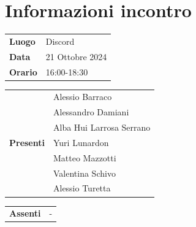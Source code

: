 \section{Informazioni incontro}
\vspace{0.25cm}
\begin{tabular}{p{1.75cm} | l}
    \textbf{Luogo} & Discord \\
    \textbf{Data} & 21 Ottobre 2024\\
    \textbf{Orario} & 16:00-18:30\\
\end{tabular}

\vspace{0.5cm}
\noindent
\begin{tabular}{p{1.75cm} | l}
    \multirow{7}{*}{\textbf{Presenti}}
        & Alessio Barraco\\
        & Alessandro Damiani \\
        & Alba Hui Larrosa Serrano\\
        & Yuri Lunardon\\
        & Matteo Mazzotti\\
        & Valentina Schivo\\
        & Alessio Turetta
\end{tabular}

\vspace{0.5cm}
\noindent
\begin{tabular}{p{1.75cm} | l}
    \multirow{1}{*}{\textbf{Assenti}}
        & -\\
\end{tabular}

\vspace{0.5cm}
\noindent
